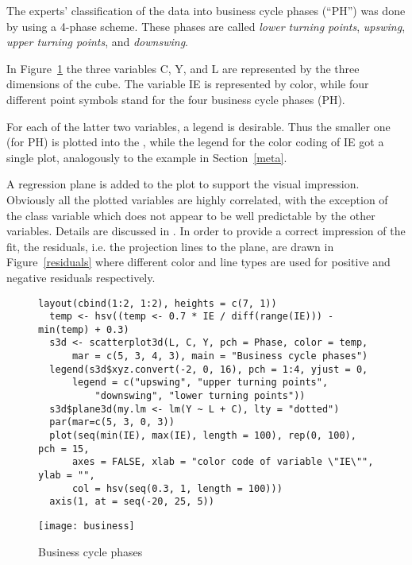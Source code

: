 The experts' classification of the data into business cycle phases
(``PH'') was done by  using a 4-phase scheme.
These phases are called {\sl lower turning points}, {\sl upswing}, {\sl
  upper turning points}, and {\sl downswing}.

In Figure~\ref{business} the three variables C, Y, and L are represented by
the three dimensions of the cube.  The variable IE is represented by color,
while four different point symbols stand for the four business cycle phases
(PH).

For each of the latter two variables, a legend is desirable.
Thus the smaller one (for PH) is plotted into the \sdd , while the legend
for the color coding of IE got a single plot, analogously to the example in
Section~\ref{meta}.

A regression plane is added to the plot to support the visual impression.
Obviously all the plotted variables are highly correlated, with the
exception of the class variable which does not appear to be well
predictable by the other variables.  Details are discussed in
.
%
In order to provide a correct impression of the fit, the residuals,
i.e. the projection lines to the plane, are drawn in Figure~\ref{residuals}
where different color and line types are used for positive and negative
residuals respectively.

\begin{figure}[H]
\vspace*{-10mm}
\footnotesize
\begin{Verbatim}[frame=single]
  layout(cbind(1:2, 1:2), heights = c(7, 1))
  temp <- hsv((temp <- 0.7 * IE / diff(range(IE))) - min(temp) + 0.3)
  s3d <- scatterplot3d(L, C, Y, pch = Phase, color = temp,
      mar = c(5, 3, 4, 3), main = "Business cycle phases")
  legend(s3d$xyz.convert(-2, 0, 16), pch = 1:4, yjust = 0,
      legend = c("upswing", "upper turning points",
          "downswing", "lower turning points"))
  s3d$plane3d(my.lm <- lm(Y ~ L + C), lty = "dotted")
  par(mar=c(5, 3, 0, 3))
  plot(seq(min(IE), max(IE), length = 100), rep(0, 100), pch = 15,
      axes = FALSE, xlab = "color code of variable \"IE\"", ylab = "",
      col = hsv(seq(0.3, 1, length = 100)))
  axis(1, at = seq(-20, 25, 5))
\end{Verbatim}
\normalsize
\begin{center}\texttt{[image: business]}\end{center}
\vspace*{-5mm}\caption{Business cycle phases\label{business}}
\end{figure}

